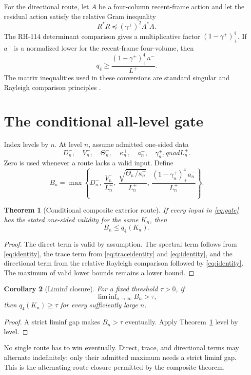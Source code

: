 \documentclass[12pt]{article}
\newtheorem{theorem}{Theorem}
\newtheorem{corollary}[theorem]{Corollary}
\newcommand{\liminfv}{\mathop{\mathrm{lim\,inf}}}
\begin{document}
For the directional route, let $A$ be a four-column recent-frame action and
let the residual action satisfy the relative Gram inequality
\[
 R^*R\preceq (\gamma^+)^2 A^*A.
\]
The RH-114 determinant comparison gives a multiplicative factor
$(1-\gamma^+)_+^4$.  If $a^-$ is a normalized lower for the recent-frame
four-volume, then
\[
 q_4\geq
 \frac{(1-\gamma^+)_+^4a^-}{L^+}.
\]
The matrix inequalities used in these conversions are standard singular and
Rayleigh comparison principles \citep{HornJohnson1991}.

\section{The conditional all-level gate}
Index levels by $n$.  At level $n$, assume admitted one-sided data
\[
 D_n^-,\quad V_n^-,\quad \Theta_n^-,\quad \kappa_n^+,
 \quad a_n^-,\quad \gamma_n^+,quad L_n^+.
\]
Zero is used whenever a route lacks a valid input.  Define
\begin{equation}\label{eq:gate}
 B_n=\max\left\{
 D_n^-,\ 
 \frac{V_n^-}{L_n^+},\ 
 \frac{\sqrt{\Theta_n^-/\kappa_n^+}}{L_n^+},\ 
 \frac{(1-\gamma_n^+)_+^4a_n^-}{L_n^+}
 \right\}.
\end{equation}

\begin{theorem}[Conditional composite exterior route]\label{thm:gate}
If every input in \eqref{eq:gate} has the stated one-sided validity for the
same $K_n$, then
\[
 B_n\leq q_4(K_n).
\]
\end{theorem}
\begin{proof}
The direct term is valid by assumption.  The spectral term follows from
\eqref{eq:identity}, the trace term from \eqref{eq:traceidentity} and
\eqref{eq:identity}, and the directional term from the relative Rayleigh
comparison followed by \eqref{eq:identity}.  The maximum of valid lower
bounds remains a lower bound.
\end{proof}

\begin{corollary}[Liminf closure]\label{cor:liminf}
For a fixed threshold $\tau>0$, if
\[
 \liminfv_{n\to\infty} B_n>\tau,
\]
then $q_4(K_n)\geq\tau$ for every sufficiently large $n$.
\end{corollary}
\begin{proof}
A strict liminf gap makes $B_n>\tau$ eventually.  Apply
Theorem~\ref{thm:gate} level by level.
\end{proof}

No single route has to win eventually.  Direct, trace, and directional terms
may alternate indefinitely; only their admitted maximum needs a strict
liminf gap.  This is the alternating-route closure permitted by the
composite theorem.
\end{document}
